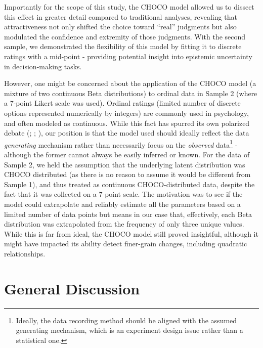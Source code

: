 \documentclass[
  jou,
  floatsintext,
  longtable,
  nolmodern,
  notxfonts,
  notimes,
  colorlinks=true,linkcolor=blue,citecolor=blue,urlcolor=blue]{apa7}
\begin{document}
Importantly for the scope of this study, the CHOCO model allowed us to
dissect this effect in greater detail compared to traditional analyses,
revealing that attractiveness not only shifted the choice toward
``real'' judgments but also modulated the confidence and extremity of
those judgments. With the second sample, we demonstrated the flexibility
of this model by fitting it to discrete ratings with a mid-point -
providing potential insight into epistemic uncertainty in
decision-making tasks.

However, one might be concerned about the application of the CHOCO model
(a mixture of two continuous Beta distributions) to ordinal data in
Sample 2 (where a 7-point Likert scale was used). Ordinal ratings
(limited number of discrete options represented numerically by integers)
are commonly used in psychology, and often modeled as continuous. While
this fact has spurred its own polarized debate
(;
;
), our
position is that the model used should ideally reflect the data
\emph{generating} mechanism rather than necessarily focus on the
\emph{observed} data\footnote{Ideally, the data recording method should
  be aligned with the assumed generating mechanism, which is an
  experiment design issue rather than a statistical one.} - although the
former cannot always be easily inferred or known. For the data of Sample
2, we held the assumption that the underlying latent distribution was
CHOCO distributed (as there is no reason to assume it would be different
from Sample 1), and thus treated as continuous CHOCO-distributed data,
despite the fact that it was collected on a 7-point scale. The
motivation was to see if the model could extrapolate and reliably
estimate all the parameters based on a limited number of data points but
means in our case that, effectively, each Beta distribution was
extrapolated from the frequency of only three unique values. While this
is far from ideal, the CHOCO model still proved insightful, although it
might have impacted its ability detect finer-grain changes, including
quadratic relationships.

\section{General Discussion}\label{general-discussion}
\end{document}
